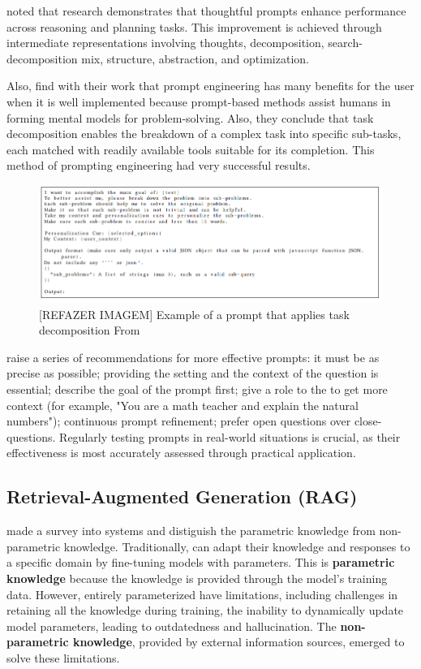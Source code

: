 \citet{ma_beyond_2023} noted that research demonstrates that thoughtful prompts enhance {\llm} performance across reasoning and planning tasks. This improvement is achieved through intermediate representations involving thoughts, decomposition, search-decomposition mix, structure, abstraction, and optimization.

Also, \citet{ma_beyond_2023} find with their work that prompt engineering has many benefits for the user when it is well implemented because prompt-based methods assist humans in forming mental models for problem-solving. Also, they conclude that task decomposition enables the breakdown of a complex task into specific sub-tasks, each matched with readily available tools suitable for its completion. This method of prompting engineering had very successful results.

\begin{figure}[ht]
    \includegraphics[width=14cm]{figs/chapter2/prompt.png}
    \centering
    \caption{[REFAZER IMAGEM] Example of a prompt that applies task decomposition From \citet{ma_beyond_2023}}
\end{figure}


\citet{mesko_prompt_2023} raise a series of recommendations for more effective {\llm} prompts: it must be as precise as possible; providing the setting and the context of the question is essential; describe the goal of the prompt first; give a role to the {\llm} to get more context (for example, "You are a math teacher and explain the natural numbers"); continuous {\llm} prompt refinement; prefer open questions over close-questions. Regularly testing prompts in real-world situations is crucial, as their effectiveness is most accurately assessed through practical application.


\subsection{Retrieval-Augmented Generation (RAG)}

\citet{gao_retrieval-augmented_2023} made a survey into {\rag} systems and distiguish the parametric knowledge from non-parametric knowledge. Traditionally, {\llm} can adapt their knowledge and responses to a specific domain by fine-tuning models with parameters. This is \textbf{parametric knowledge} because the {\llm} knowledge is provided through the model's training data. However, entirely parameterized {\llm} have limitations, including challenges in retaining all the knowledge during training, the inability to dynamically update model parameters, leading to outdatedness and hallucination. The \textbf{non-parametric knowledge}, provided by external information sources, emerged to solve these limitations.

